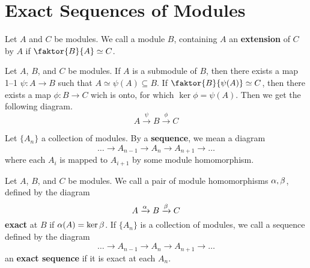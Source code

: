 \section{Exact Sequences of Modules}

\begin{definition}
    Let $A$ and  $C$ be modules. We call a module  $B$, containing  $A$ an
    \textbf{extension} of $C$ by  $A$ if  $\faktor{B}{A} \simeq C$.
\end{definition}

\begin{example}\label{example_4.13}
    Let $A$,  $B$, and  $C$ be modules. If  $A$ is a submodule of  $B$, then
    there exists a map 1--1 $\psi:A \xrightarrow{} B$ such that $A \simeq
    \psi(A) \subseteq B$. If $\faktor{B}{\psi(A)} \simeq C$, then there exists a
    map $\phi:B \xrightarrow{} C$ wich is onto, for which $\ker{\phi}=\psi(A)$.
    Then we get the following diagram.
    \begin{equation*}
        A \xrightarrow{\psi} B \xrightarrow{\phi} C
    \end{equation*}
\end{example}

\begin{definition}
    Let $\{A_n\}$ a collection of modules. By a \textbf{sequence}, we mean a
    diagram
    \begin{equation*}
        \dots \xrightarrow{} A_{n-1} \xrightarrow{} A_n \xrightarrow{} A_{n+1}
        \xrightarrow{} \dots
    \end{equation*}
    where each $A_i$ is mapped to $A_{i+1}$ by some module homomorphism.
\end{definition}

\begin{definition}
    Let $A$,  $B$, and  $C$ be modules. We call a pair of module homomorphisms
    $\alpha,\beta$, defined by the diagram
    \begin{equation*}
        A \xrightarrow{\alpha} B \xrightarrow{\beta} C
    \end{equation*}
    \textbf{exact} at $B$ if  $\alpha(A)=\ker{\beta}$. If $\{A_n\}$ is a collection of
    modules, we call a sequence defined by the diagram
    \begin{equation*}
        \dots \xrightarrow{} A_{n-1} \xrightarrow{} A_n \xrightarrow{} A_{n+1}
        \xrightarrow{} \dots
    \end{equation*}
    an \textbf{exact sequence} if it is exact at each $A_n$.
\end{definition}

